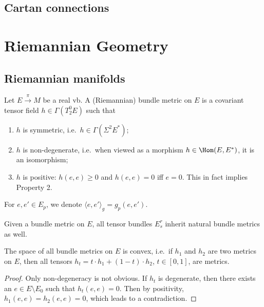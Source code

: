 \subsection{Cartan connections}













\newpage
\section{Riemannian Geometry}

\subsection{Riemannian manifolds}\label{sec: Riemannian mfds}


\begin{defn}
Let $E\overset\pi\to M$ be a real \gls{vb}. A (Riemannian) bundle metric on $E$ is a covariant tensor field $h\in\Gamma(T^0_2 E)$ such that
\begin{enumerate}
    \item $h$ is symmetric, i.e.\ $h\in\Gamma(\Sigma^2 E^\ast)$;
    \item $h$ is non-degenerate, i.e.\ when viewed as a morphism $h\in\Hom(E,E^\ast)$, it is an isomorphism;
    \item $h$ is positive: $h(e,e)\geq 0$ and $h(e,e)=0$ iff $e=0$. This in fact implies Property 2.
\end{enumerate}
For $e,e'\in E_p$, we denote $\langle e,e'\rangle_g=g_p(e,e')$.
\end{defn}

Given a bundle metric on $E$, all tensor bundles $E^r_s$ inherit natural bundle metrics as well.

\begin{prop}
The space of all bundle metrics on $E$ is convex, i.e.\ if $h_1$ and $h_2$ are two metrics on $E$, then all tensors $h_t=t \cdot h_1+(1-t)\cdot h_2$, $t\in[0,1]$, are metrics.
\end{prop}
\begin{proof}
Only non-degeneracy is not obvious. If $h_t$ is degenerate, then there exists an $e\in E\setminus E_0$ such that $h_t(e,e)=0$. Then by positivity, $h_1(e,e)=h_2(e,e)=0$, which leads to a contradiction.
\end{proof}

